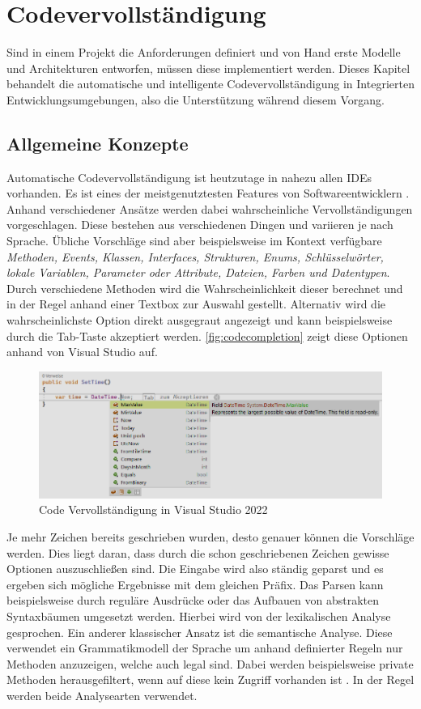 \section{Codevervollständigung}
\label{sec:codecompletion}
Sind in einem Projekt die Anforderungen definiert und von Hand erste Modelle und Architekturen entworfen, müssen diese implementiert werden. Dieses Kapitel behandelt die automatische und intelligente Codevervollständigung in Integrierten Entwicklungsumgebungen, also die Unterstützung während diesem Vorgang. 

\subsection{Allgemeine Konzepte}
\label{subsec:completion_concepts}
Automatische Codevervollständigung ist heutzutage in nahezu allen IDEs vorhanden. Es ist eines der meistgenutztesten Features von Softwareentwicklern \cite{MurphyKerstenFindlater2006}. Anhand verschiedener Ansätze werden dabei wahrscheinliche Vervollständigungen vorgeschlagen. Diese bestehen aus verschiedenen Dingen und variieren je nach Sprache. Übliche Vorschläge sind aber beispielsweise im Kontext verfügbare \textit{Methoden, Events, Klassen, Interfaces, Strukturen, Enums, Schlüsselwörter, lokale Variablen, Parameter oder Attribute, Dateien, Farben und Datentypen}. Durch verschiedene Methoden wird die Wahrscheinlichkeit dieser berechnet und in der Regel anhand einer Textbox zur Auswahl gestellt. Alternativ wird die wahrscheinlichste Option direkt ausgegraut angezeigt und kann beispielsweise durch die Tab-Taste akzeptiert werden. \autoref{fig:codecompletion} zeigt diese Optionen anhand von Visual Studio auf. 
\begin{figure}[!htb] 
	\centering
	\includegraphics[width=125mm]{images/codecompletion.png}
	\caption{Code Vervollständigung in Visual Studio 2022}
	\label{fig:codecompletion}
\end{figure}
\FloatBarrier
Je mehr Zeichen bereits geschrieben wurden, desto genauer können die Vorschläge werden. Dies liegt daran, dass durch die schon geschriebenen Zeichen gewisse Optionen auszuschließen sind. Die Eingabe wird also ständig geparst und es ergeben sich mögliche Ergebnisse mit dem gleichen Präfix. Das Parsen kann beispielsweise durch reguläre Ausdrücke oder das Aufbauen von abstrakten Syntaxbäumen umgesetzt werden. Hierbei wird von der lexikalischen Analyse gesprochen. Ein anderer klassischer Ansatz ist die semantische Analyse. Diese verwendet ein Grammatikmodell der Sprache um anhand definierter Regeln nur Methoden anzuzeigen, welche auch legal sind. Dabei werden beispielsweise private Methoden herausgefiltert, wenn auf diese kein Zugriff vorhanden ist \cite{MarasoiuChurchBlackwell2015}. In der Regel werden beide Analysearten verwendet. 

